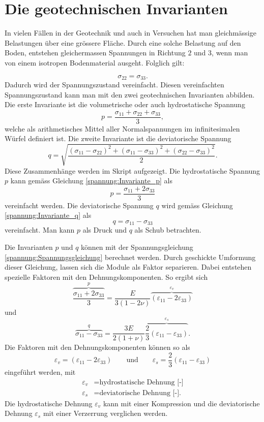 \section{Die geotechnischen Invarianten\label{spannung:section:Die geotechnischen Invarianten}}
In vielen Fällen in der Geotechnik und auch in Versuchen hat man gleichmässige Belastungen über eine grössere Fläche.
Durch eine solche Belastung auf den Boden, entstehen gleichermassen Spannungen in Richtung $2$ und $3$,
wenn man von einem isotropen Bodenmaterial ausgeht.
Folglich gilt:

\[
\sigma_{22}
=
\sigma_{33}
.
\]
Dadurch wird der Spannungszustand vereinfacht.
Diesen vereinfachten Spannungszustand kann man mit den zwei geotechnischen Invarianten abbilden.
Die erste Invariante ist die volumetrische oder auch hydrostatische Spannung
\begin{equation}
p
=
\frac{\sigma_{11}+\sigma_{22}+\sigma_{33}}{3}
\label{spannung:Invariante_p}
,
\end{equation}
welche als arithmetisches Mittel aller Normalspannungen im infinitesimalen Würfel definiert ist.
Die zweite Invariante ist die deviatorische Spannung
\begin{equation}
q
=
\sqrt{\frac{(\sigma_{11}-\sigma_{22})^{2}+(\sigma_{11}-\sigma_{33})^{2}+(\sigma_{22}-\sigma_{33})^{2}}{2}}
\label{spannung:Invariante_q}
.
\end{equation}
Diese Zusammenhänge werden im Skript \cite{spannung:Stoffgesetze-und-numerische-Modellierung-in-der-Geotechnik} aufgezeigt.
Die hydrostatische Spannung $p$ kann gemäss Gleichung \eqref{spannung:Invariante_p} als
\[
p
=
\frac{\sigma_{11}+2\sigma_{33}}{3}
\]
vereinfacht werden.
Die deviatorische Spannung $q$ wird gemäss Gleichung \eqref{spannung:Invariante_q} als
\[
q
=
\sigma_{11}-\sigma_{33}
\]
vereinfacht. Man kann $p$ als Druck und $q$ als Schub betrachten.

Die Invarianten $p$ und $q$ können mit der Spannungsgleichung \eqref{spannung:Spannungsgleichung} berechnet werden.
Durch geschickte Umformung dieser Gleichung, lassen sich die Module als Faktor separieren.
Dabei entstehen spezielle Faktoren mit den Dehnungskomponenten.
So ergibt sich
\[
\overbrace{\frac{\sigma_{11}+2\sigma_{33}}{3}}^{\displaystyle{p}}
=
\frac{E}{3(1-2\nu)} \overbrace{(\varepsilon_{11} - 2\varepsilon_{33})}^{\displaystyle{{\varepsilon_{v}}}}
\]
und
\[
\overbrace{\sigma_{11}-\sigma_{33}}^{\displaystyle{q}}
=
\frac{3E}{2(1+\nu)} \overbrace{\frac{2}{3}(\varepsilon_{11} - \varepsilon_{33})}^{\displaystyle{\varepsilon_{s}}}
.
\]
Die Faktoren mit den Dehnungskomponenten können so als
\[
\varepsilon_{v}
=
(\varepsilon_{11} - 2\varepsilon_{33})
\qquad
\text{und}
\qquad
\varepsilon_{s}
=
\frac{2}{3}(\varepsilon_{11} - \varepsilon_{33})
\]
eingeführt werden, mit
\begin{align*}
	\varepsilon_{v} &= \text{hydrostatische Dehnung [-]} \\
	\varepsilon_{s} &= \text{deviatorische Dehnung [-].}
\end{align*}
Die hydrostatische Dehnung $\varepsilon_{v}$ kann mit einer Kompression und
die deviatorische Dehnung $\varepsilon_{s}$  mit einer Verzerrung verglichen werden.

